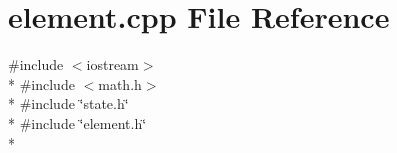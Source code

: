 \section{element.\-cpp File Reference}
\label{element_8cpp}
{\ttfamily \#include $<$iostream$>$}\\*
{\ttfamily \#include $<$math.\-h$>$}\\*
{\ttfamily \#include \char`\"{}state.\-h\char`\"{}}\\*
{\ttfamily \#include \char`\"{}element.\-h\char`\"{}}\\*
